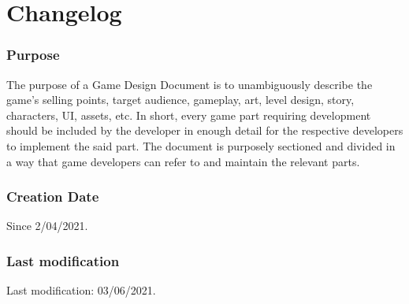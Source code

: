 \section{Changelog}

\subsubsection*{Purpose}
The purpose of a Game Design Document is to unambiguously describe the game's selling points, target audience, gameplay, art, level design, story, characters, UI, assets, etc. In short, every game part requiring development should be included by the developer in enough detail for the respective developers to implement the said part. The document is purposely sectioned and divided in a way that game developers can refer to and maintain the relevant parts.

\subsubsection*{Creation Date}
Since 2/04/2021.

\subsubsection*{Last modification}
Last modification: 03/06/2021.\\

